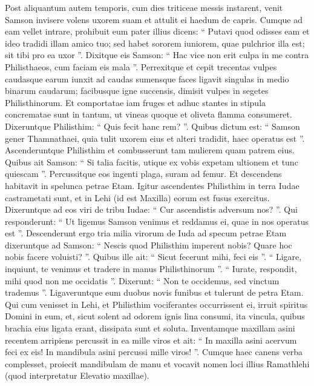 \begin{biblechapter}
\begin{biblechapter}
\begin{biblechapter}
\begin{biblechapter}
\begin{biblechapter}
\begin{biblechapter}
\begin{biblechapter}
\begin{biblechapter}
\begin{biblechapter}
\begin{biblechapter}
\begin{biblechapter}
\begin{biblechapter}
\begin{biblechapter}
\begin{biblechapter}
\begin{biblechapter}
\verse Post aliquantum autem temporis, cum dies triticeae messis instarent, venit Samson invisere volens uxorem suam et attulit ei haedum de capris. Cumque ad eam vellet intrare, prohibuit eum pater illius 
\verse dicens: “ Putavi quod odisses eam et ideo tradidi illam amico tuo; sed habet sororem iuniorem, quae pulchrior illa est; sit tibi pro ea uxor ”. 
\verse Dixitque eis Samson: “ Hac vice non erit culpa in me contra Philisthaeos, cum faciam eis mala ”. 
\verse Perrexitque et cepit trecentas vulpes caudasque earum iunxit ad caudas sumensque faces ligavit singulas in medio binarum caudarum; 
\verse facibusque igne succensis, dimisit vulpes in segetes Philisthinorum. Et comportatae iam fruges et adhuc stantes in stipula concrematae sunt in tantum, ut vineas quoque et oliveta flamma consumeret. 
\verse Dixeruntque Philisthim: “ Quis fecit hanc rem? ”. Quibus dictum est: “ Samson gener Thamnathaei, quia tulit uxorem eius et alteri tradidit, haec operatus est ”. Ascenderuntque Philisthim et combusserunt tam mulierem quam patrem eius. 
\verse Quibus ait Samson: “ Si talia facitis, utique ex vobis expetam ultionem et tunc quiescam ”. 
\verse Percussitque eos ingenti plaga, suram ad femur. Et descendens habitavit in spelunca petrae Etam.
 \verse Igitur ascendentes Philisthim in terra Iudae castrametati sunt, et in Lehi (id est Maxilla) eorum est fusus exercitus. 
\verse Dixeruntque ad eos viri de tribu Iudae: “ Cur ascendistis adversum nos? ”. Qui responderunt: “ Ut ligemus Samson venimus et reddamus ei, quae in nos operatus est ”. 
\verse Descenderunt ergo tria milia virorum de Iuda ad specum petrae Etam dixeruntque ad Samson: “ Nescis quod Philisthim imperent nobis? Quare hoc nobis facere voluisti? ”. Quibus ille ait: “ Sicut fecerunt mihi, feci eis ”. 
\verse “ Ligare, inquiunt, te venimus et tradere in manus Philisthinorum ”. “ Iurate, respondit, mihi quod non me occidatis ”. 
\verse Dixerunt: “ Non te occidemus, sed vinctum trademus ”. Ligaveruntque eum duobus novis funibus et tulerunt de petra Etam.
 \verse Qui cum venisset in Lehi, et Philisthim vociferantes occurrissent ei, irruit spiritus Domini in eum, et, sicut solent ad odorem ignis lina consumi, ita vincula, quibus brachia eius ligata erant, dissipata sunt et soluta.
 \verse Inventamque maxillam asini recentem arripiens percussit in ea mille viros 
 \verse et ait:
 “ In maxilla asini
 acervum feci ex eis!
 In mandibula asini
 percussi mille viros! ”.
 \verse Cumque haec canens verba complesset, proiecit mandibulam de manu et vocavit nomen loci illius Ramathlehi (quod interpretatur Elevatio maxillae). 

\end{biblechapter}
\end{biblechapter}
\end{biblechapter}
\end{biblechapter}
\end{biblechapter}
\end{biblechapter}
\end{biblechapter}
\end{biblechapter}
\end{biblechapter}
\end{biblechapter}
\end{biblechapter}
\end{biblechapter}
\end{biblechapter}
\end{biblechapter}
\end{biblechapter}
